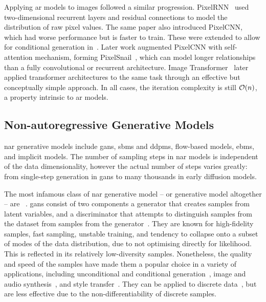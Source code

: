 Applying \gls{ar} models to images followed a similar progression.
PixelRNN~\cite{oord2016pixelrnn} used two-dimensional recurrent layers and
residual connections to model the distribution of raw pixel values. The same
paper also introduced PixelCNN, which had worse performance but is faster to
train. These were extended to allow for conditional generation
in~\cite{oord2016pixelcnn}. Later work augmented PixelCNN with self-attention
mechanism, forming PixelSnail~\cite{chen2017snail}, which can model longer
relationships than a fully convolutional or recurrent architecture. Image
Transformer~\cite{parmar2018image} later applied transformer architectures to
the same task through an effective but conceptually simple approach. In all
cases, the iteration complexity is still $\mathcal{O}(n)$, a property intrinsic to
\gls{ar} models.

\subsection{Non-autoregressive Generative Models}
\label{subsec:nagm}

\Acrfull{nar} generative models include \glspl{gan}, \glspl{sbm} and
\glspl{ddpm}, flow-based models, \glspl{ebm}, and implicit models. The number of
sampling steps in \gls{nar} models is independent of the data dimensionality,
however the actual number of steps varies greatly: from single-step generation
in \glspl{gan} to many thousands in early diffusion models.

The most infamous class of \gls{nar} generative model -- or generative model
altogether -- are ~\cite{goodfellow2014gan}. \Glspl{gan} consist
of two components a generator that creates samples from latent variables, and a
discriminator that attempts to distinguish samples from the dataset from samples
from the generator~\cite{goodfellow2014gan}. They are known for high-fidelity
samples, fast sampling, unstable training, and tendency to collapse onto a
subset of modes of the data distribution, due to not optimising directly for
likelihood. This is reflected in its relatively low-diversity samples.
Nonetheless, the quality and speed of the samples have made them a popular
choice in a variety of applications, including unconditional and conditional
generation~\cite{tero2018stylegan,andrew2018biggan}, image and audio
synthesis~\cite{liu2020audiogan}, and style transfer~\cite{zhu2017cyclegan}.
They can be applied to discrete data~\cite{autume2019scratchgan}, but are
less effective due to the non-differentiability of discrete samples.

